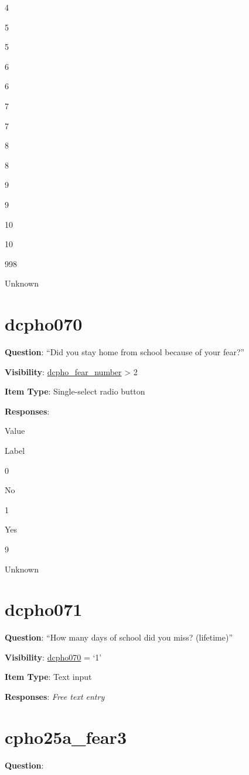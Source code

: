 \documentclass[]{book}
\begin{document}
4

5

5

6

6

7

7

8

8

9

9

10

10

998

Unknown

\hypertarget{dcpho070}{%
\section{dcpho070}\label{dcpho070}}

\textbf{Question}: ``Did you stay home from school because of your fear?''

\textbf{Visibility}: \protect\hyperlink{dcpho_fear_number}{dcpho\_fear\_number} \textgreater{} 2

\textbf{Item Type}: Single-select radio button

\textbf{Responses}:

Value

Label

0

No

1

Yes

9

Unknown

\hypertarget{dcpho071}{%
\section{dcpho071}\label{dcpho071}}

\textbf{Question}: ``How many days of school did you miss? (lifetime)''

\textbf{Visibility}: \protect\hyperlink{dcpho070}{dcpho070} = `1'

\textbf{Item Type}: Text input

\textbf{Responses}: \emph{Free text entry}

\hypertarget{cpho25a_fear3}{%
\section{cpho25a\_fear3}\label{cpho25a_fear3}}

\textbf{Question}:
\end{document}
